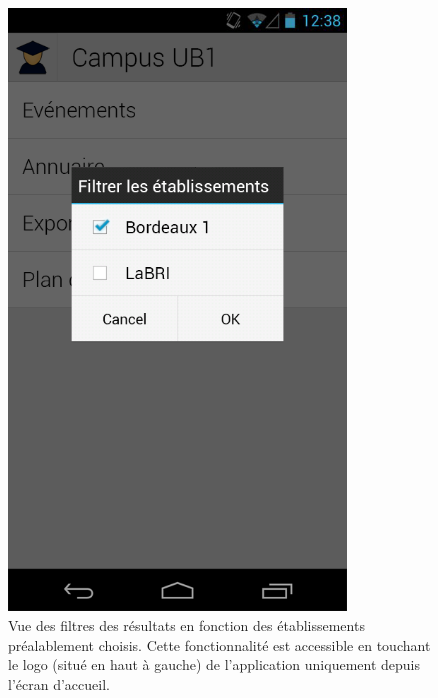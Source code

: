 \documentclass [pdftex,12pt] {report}
\begin{document}
\begin{figure}
  \begin{minipage}[t]{8cm}
    \centering
    \includegraphics[width=0.8\textwidth]{resources/ui_preview/03}
    \caption{Vue des filtres des résultats en fonction des établissements préalablement choisis. Cette fonctionnalité est accessible en touchant le logo (situé en haut à gauche) de l'application uniquement depuis l'écran d'accueil.}
    \label{fig:03}
  \end{minipage}
  \hspace{+20pt}
  \begin{minipage}[t]{8cm}
    \centering

\end{minipage}
\end{figure}
\end{document}
